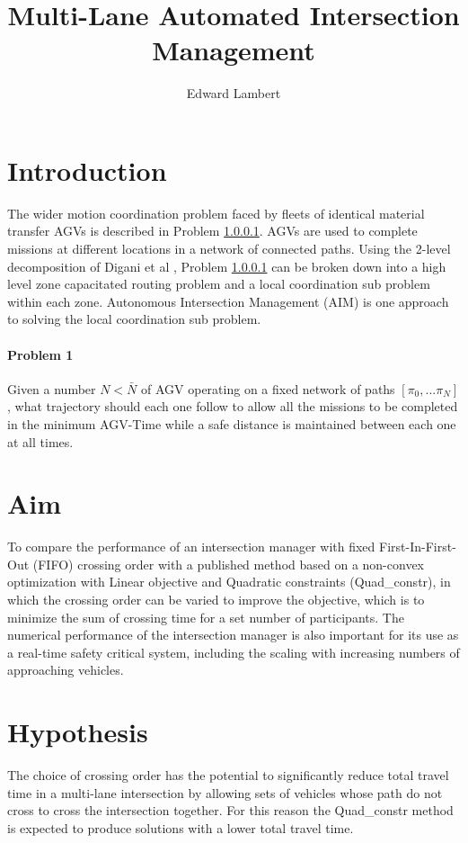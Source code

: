 \documentclass[11pt]{article} %
\author{Edward Lambert}
\title{Multi-Lane Automated Intersection Management}
\begin{document}
\maketitle
\section{Introduction}
The wider motion coordination problem faced by fleets of identical material transfer AGVs is described in Problem \ref{prob1}. AGVs are used to complete missions at different locations in a network of connected paths. Using the 2-level decomposition of Digani et al \cite{Digani2015}, Problem \ref{prob1} can be broken down into a high level zone capacitated routing problem and a local coordination sub problem within each zone. Autonomous Intersection Management (AIM) is one approach to solving the local coordination sub problem.

\paragraph{Problem 1}
\label{prob1}
Given a number $N<\bar{N}$ of AGV operating on a fixed network of paths $[\pi_0, ... \pi_N]$, what trajectory should each one follow to allow all the missions to be completed in the minimum AGV-Time while a safe distance is maintained between each one at all times.

\section{Aim}
To compare the performance of an intersection manager with fixed First-In-First-Out (FIFO) crossing order with a published method based on a non-convex optimization with Linear objective and Quadratic constraints (Quad\_constr), in which the crossing order can be varied to improve the objective, which is to minimize the sum of crossing time for a set number of participants. The numerical performance of the intersection manager is also important for its use as a real-time safety critical system, including the scaling with increasing numbers of approaching vehicles. 

\section{Hypothesis}
The choice of crossing order has the potential to significantly reduce total travel time in a multi-lane intersection by allowing sets of vehicles whose path do not cross to cross the intersection together. For this reason the Quad\_constr method is expected to produce solutions with a lower total travel time.
\end{document}
